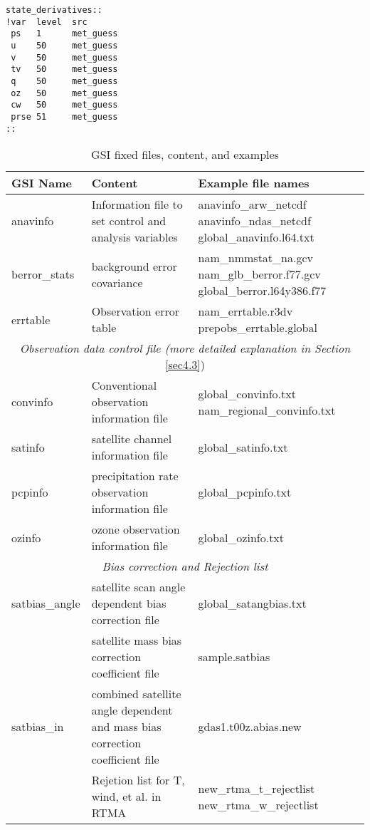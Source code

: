 \begin{small}
\begin{verbatim}
state_derivatives::
!var  level  src
 ps   1      met_guess
 u    50     met_guess
 v    50     met_guess
 tv   50     met_guess
 q    50     met_guess
 oz   50     met_guess
 cw   50     met_guess
 prse 51     met_guess
::
\end{verbatim}
\end{small}


\begin{table}[h!]
\centering
\begin{footnotesize}
\caption{GSI fixed files, content, and examples}
\begin{tabular}{|p{2.5cm}|p{5cm}|p{7cm}|}
\hline
\hline
GSI Name  & Content & Example file names \\
\hline
\hline
anavinfo & Information file to set control and analysis variables &	
anavinfo\_arw\_netcdf  \newline
anavinfo\_ndas\_netcdf    
global\_anavinfo.l64.txt  \\
\hline
berror\_stats &	background error covariance &	nam\_nmmstat\_na.gcv
nam\_glb\_berror.f77.gcv
global\_berror.l64y386.f77 \\
\hline
errtable & Observation error table & nam\_errtable.r3dv \newline
prepobs\_errtable.global \\
\hline
\multicolumn{3}{|c|}{\textit{Observation data control file (more detailed explanation in Section} \ref{sec4.3})} \\
\hline
convinfo & Conventional observation information file & global\_convinfo.txt
nam\_regional\_convinfo.txt \\
\hline
satinfo & satellite channel information file & 	global\_satinfo.txt \\
\hline
pcpinfo	& precipitation rate observation information file & global\_pcpinfo.txt \\
\hline
ozinfo & ozone observation information file	& global\_ozinfo.txt \\
\hline
\multicolumn{3}{|c|}{\textit{Bias correction and Rejection list}} \\
\hline 
satbias\_angle & satellite scan angle dependent bias correction file	& global\_satangbias.txt \\
\hline
\multirow{3}{2cm}{satbias\_in} & satellite mass bias correction coefficient file & sample.satbias \\ \cline{2-3} 
& combined satellite angle dependent and mass bias correction coefficient file &	gdas1.t00z.abias.new \\
\hline
t\_rejectlist, w\_rejectlist,.. & Rejetion list for T, wind, et al. in RTMA	& new\_rtma\_t\_rejectlist
new\_rtma\_w\_rejectlist \\
\hline
\end{tabular}
\label{t32}
\end{footnotesize}
\end{table} 

